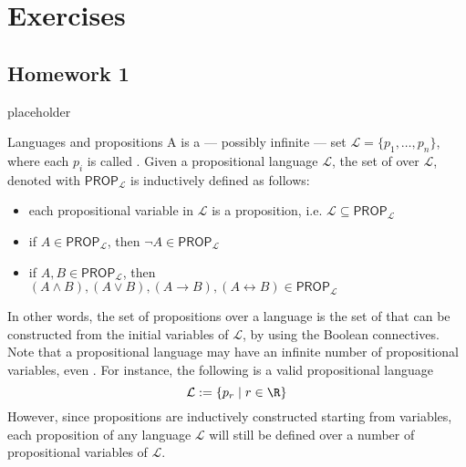 \documentclass[a4paper, 12pt]{report}
\institute{\curlyquotes{\hspace{0.25mm}Sapienza} Università di Roma}
\subtitle{Appunti integrati con il libro \book}
\author{\textit{Autore}\\\authorName}
\institute{\curlyquotes{\hspace{0.25mm}Sapienza} University of Rome}
\subtitle{Lecture notes integrated with the book \book}
\author{\textit{Author}\\\authorName}
\title{\courseName}
\date{\today}
\begin{document}
    \maketitle

    {
        \hypersetup{allcolors=black}

        \romantableofcontents
    }

    \introduction


    \chapter{Exercises}

    \section{Homework 1}

    placeholder 

    \begin{frameddefn}{Languages and propositions}
        A  is a --- possibly infinite --- set $\mathcal L = \{p_1, \ldots, p_n\}$, where each $p_i$ is called . Given a propositional language $\mathcal L$, the set of  over $\mathcal L$, denoted with $\textsf{PROP}_{\mathcal L}$ is inductively defined as follows:

        \begin{itemize}
            \item each propositional variable in $\mathcal L$ is a proposition, i.e. $\mathcal L \subseteq \textsf{PROP}_{\mathcal L}$
            \item if $A \in \textsf{PROP}_{\mathcal L}$, then $\lnot A \in \textsf{PROP}_{\mathcal L}$
            \item if $A, B \in \textsf{PROP}_{\mathcal L}$, then $(A \land B), (A \lor B), (A \rightarrow B), (A \leftrightarrow B) \in \textsf{PROP}_{\mathcal L}$
        \end{itemize}
    \end{frameddefn}

    In other words, the set of propositions over a language is the set of  that can be constructed from the initial variables of $\mathcal L$, by using the Boolean connectives. Note that a propositional language may have an infinite number of propositional variables, even . For instance, the following is a valid propositional language $$\mathcal L := \{p_r \mid r \in \R\}$$ However, since propositions are inductively constructed starting from variables, each proposition of any language $\mathcal L$ will still be defined over a  number of propositional variables of $\mathcal L$.
\end{document}
